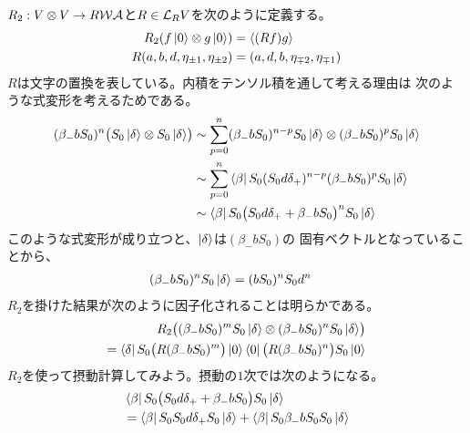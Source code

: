 {	$R_2:V\otimes V\to R{{\mathcal{W}}}{{\mathcal{A}}}$と$R\in\mathcal{L}_RV$を次のように定義する。
	\begin{equation*}\begin{split}
		R_2(f\mathinner{|{0}\rangle}\otimes g\mathinner{|{0}\rangle}) &= \mathinner{\langle{(Rf)g}\rangle} \\
		R(a,b,d,\eta_{\pm1},\eta_{\pm2}) &= (a,d,b,\eta_{\mp2},\eta_{\mp1}) \\
	\end{split}\end{equation*}
	$R$は文字の置換を表している。内積をテンソル積を通して考える理由は
	次のような式変形を考えるためである。
	\begin{equation*}\begin{split}
		(\beta_-bS_0)^n \bigl(S_0\mathinner{|{\delta}\rangle}\otimes S_0\mathinner{|{\delta}\rangle}\bigr)
		&\sim \sum_{p=0}^n (\beta_-bS_0)^{n-p}S_0\mathinner{|{\delta}\rangle}
			\otimes (\beta_-bS_0)^{p}S_0\mathinner{|{\delta}\rangle} \\
		&\sim \sum_{p=0}^n \mathinner{\langle{\beta}|}S_0(S_0d\delta_+)^{n-p}
			(\beta_-bS_0)^{p}S_0\mathinner{|{\delta}\rangle} \\
		&\sim \mathinner{\langle{\beta}|}S_0\bigl(S_0d\delta_+ + \beta_-bS_0\bigr)^n
			S_0\mathinner{|{\delta}\rangle} \\
	\end{split}\end{equation*}
	このような式変形が成り立つと、$\mathinner{|{\delta}\rangle}$は$(\beta_-bS_0)$の
	固有ベクトルとなっていることから、
	\begin{equation*}\begin{split}
		(\beta_-bS_0)^nS_0\mathinner{|{\delta}\rangle} &= (bS_0)^nS_0d^n
	\end{split}\end{equation*}
	$R_2$を掛けた結果が次のように因子化されることは明らかである。
	\begin{equation*}\begin{split}
		R_2\bigl((\beta_-bS_0)^mS_0\mathinner{|{\delta}\rangle}
			\otimes(\beta_-bS_0)^nS_0\mathinner{|{\delta}\rangle}\bigr) \\
		= \mathinner{\langle{\delta}|}S_0\bigl(R(\beta_-bS_0)^m\bigr)\mathinner{|{0}\rangle}
			\mathinner{\langle{0}|}\bigl(R(\beta_-bS_0)^n\bigr)S_0\mathinner{|{0}\rangle}
	\end{split}\end{equation*}
	$R_2$を使って摂動計算してみよう。摂動の$1$次では次のようになる。
	\begin{equation*}\begin{split}
		&\bra{\beta}S_0\bigl(S_0d\delta_+ + \beta_-bS_0\bigr)S_0\ket{\delta} \\
		&= \bra{\beta}S_0 S_0d\delta_+ S_0\ket{\delta}
		+ \bra{\beta}S_0 \beta_-bS_0 S_0\ket{\delta} \\

\end{split}
\end{equation*}}
